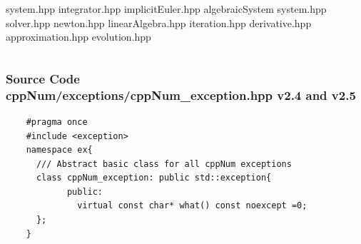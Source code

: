 \documentclass[ucs,10pt]{beamer}
\begin{document}
\begin{frame}
\begin{columns}
\begin{column}{0.5\textwidth}
               		    \indent \indent system.hpp \newline
                 	    \indent \indent integrator.hpp \newline
                 	    \indent \indent implicitEuler.hpp \newline
                 	  \indent algebraicSystem \newline
                 	    \indent \indent system.hpp \newline
                 	    \indent \indent solver.hpp \newline
                  	    \indent \indent newton.hpp \newline
                 	  \indent linearAlgebra.hpp \newline
               	 	  \indent iteration.hpp \newline
                 	  \indent derivative.hpp \newline
                 	  \indent approximation.hpp \newline
		 	  \indent evolution.hpp \newline
     		\end{column}
	\end{columns}
\end{frame}

\begin{frame}[fragile]
\frametitle{Source Code \\
        \small \color{rwth-blue} cppNum/exceptions/cppNum\_exception.hpp v2.4 and v2.5 }
	\begin{lstlisting}
	#pragma once
	#include <exception>
	namespace ex{
  	  /// Abstract basic class for all cppNum exceptions
  	  class cppNum_exception: public std::exception{
    	    public:
    	      virtual const char* what() const noexcept =0;
  	  };
	}
	\end{lstlisting}
\end{frame}
\end{document}
